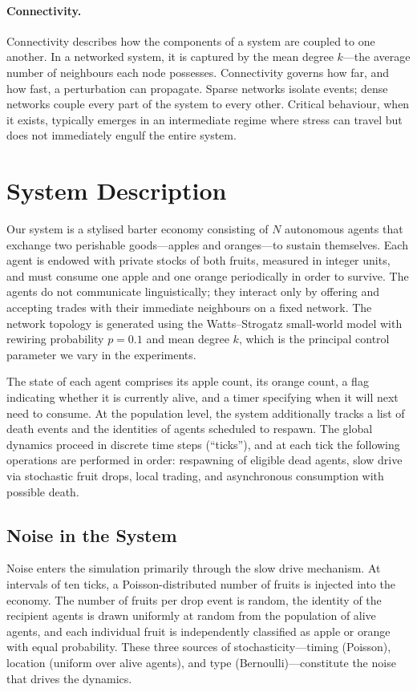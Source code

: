 \documentclass[11pt,a4paper]{article}
\begin{document}
\paragraph{Connectivity.} Connectivity describes how the components of a
system are coupled to one another. In a networked system, it is captured by
the mean degree $k$---the average number of neighbours each node possesses.
Connectivity governs how far, and how fast, a perturbation can propagate.
Sparse networks isolate events; dense networks couple every part of the
system to every other. Critical behaviour, when it exists, typically
emerges in an intermediate regime where stress can travel but does not
immediately engulf the entire system.

\section{System Description}

Our system is a stylised barter economy consisting of $N$ autonomous agents
that exchange two perishable goods---apples and oranges---to sustain
themselves. Each agent is endowed with private stocks of both fruits,
measured in integer units, and must consume one apple and one orange
periodically in order to survive. The agents do not communicate
linguistically; they interact only by offering and accepting trades with
their immediate neighbours on a fixed network. The network topology is
generated using the Watts--Strogatz small-world model with rewiring
probability $p=0.1$ and mean degree $k$, which is the principal control
parameter we vary in the experiments.

The state of each agent comprises its apple count, its orange count, a flag
indicating whether it is currently alive, and a timer specifying when it
will next need to consume. At the population level, the system additionally
tracks a list of death events and the identities of agents scheduled to
respawn. The global dynamics proceed in discrete time steps (``ticks''), and
at each tick the following operations are performed in order: respawning of
eligible dead agents, slow drive via stochastic fruit drops, local trading,
and asynchronous consumption with possible death.

\subsection{Noise in the System}

Noise enters the simulation primarily through the slow drive mechanism. At
intervals of ten ticks, a Poisson-distributed number of fruits is injected
into the economy. The number of fruits per drop event is random, the
identity of the recipient agents is drawn uniformly at random from the
population of alive agents, and each individual fruit is independently
classified as apple or orange with equal probability. These three sources of
stochasticity---timing (Poisson), location (uniform over alive agents), and
type (Bernoulli)---constitute the noise that drives the dynamics.
\end{document}
